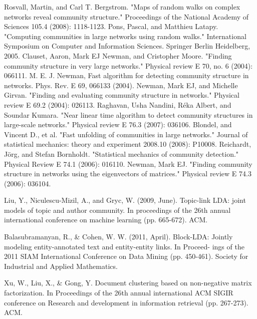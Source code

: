 \documentclass[conference]{IEEEtran}
\begin{document}
\begin{thebibliography}{}
Rosvall, Martin, and Carl T. Bergstrom. "Maps of random walks on complex networks reveal community structure." Proceedings of the National Academy of Sciences 105.4 (2008): 1118-1123.
Pons, Pascal, and Matthieu Latapy. "Computing communities in large networks using random walks." International Symposium on Computer and Information Sciences. Springer Berlin Heidelberg, 2005.
Clauset, Aaron, Mark EJ Newman, and Cristopher Moore. "Finding community structure in very large networks." Physical review E 70, no. 6 (2004): 066111.
M. E. J. Newman, Fast algorithm for detecting community structure in networks. Phys. Rev. E 69, 066133 (2004).
Newman, Mark EJ, and Michelle Girvan. "Finding and evaluating community structure in networks." Physical review E 69.2 (2004): 026113.
Raghavan, Usha Nandini, Réka Albert, and Soundar Kumara. "Near linear time algorithm to detect community structures in large-scale networks." Physical review E 76.3 (2007): 036106.
Blondel, and Vincent D., et al. "Fast unfolding of communities in large networks." Journal of statistical mechanics: theory and experiment 2008.10 (2008): P10008.
Reichardt, Jörg, and Stefan Bornholdt. "Statistical mechanics of community detection." Physical Review E 74.1 (2006): 016110.
Newman, Mark EJ. "Finding community structure in networks using the eigenvectors of matrices." Physical review E 74.3 (2006): 036104.


 Liu, Y., Niculescu-Mizil, A., and Gryc, W. (2009, June). Topic-link
LDA: joint models of topic and author community. In proceedings of the
26th annual international conference on machine learning (pp. 665-672).
ACM.

 Balasubramanyan, R., \& Cohen, W. W. (2011, April). Block-LDA:
Jointly modeling entity-annotated text and entity-entity links. In Proceed-
ings of the 2011 SIAM International Conference on Data Mining (pp.
450-461). Society for Industrial and Applied Mathematics.

 Xu, W., Liu, X., \& Gong, Y. Document clustering based on non-negative
matrix factorization. In Proceedings of the 26th annual international ACM
SIGIR conference on Research and development in information retrieval
(pp. 267-273). ACM.


\end{thebibliography}
\end{document}
